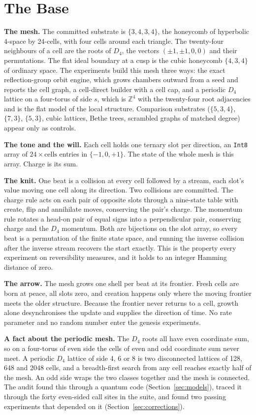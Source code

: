 \section{The Base}

\textbf{The mesh.} The committed substrate is $\{3,4,3,4\}$, the honeycomb of hyperbolic 4-space by 24-cells, with
four cells around each triangle. The twenty-four neighbours of a cell are the roots of $D_4$, the vectors
$(\pm1, \pm1, 0, 0)$ and their permutations. The flat ideal boundary at a cusp is the cubic honeycomb $\{4,3,4\}$ of
ordinary space. The experiments build this mesh three ways: the exact reflection-group orbit engine, which grows
chambers outward from a seed and reports the cell graph, a cell-direct builder with a cell cap, and a periodic
$D_4$ lattice on a four-torus of side $s$, which is $\mathbb{Z}^4$ with the twenty-four root adjacencies and is the
flat model of the local structure. Comparison substrates ($\{5,3,4\}$, $\{7,3\}$, $\{5,3\}$, cubic lattices, Bethe
trees, scrambled graphs of matched degree) appear only as controls.

\textbf{The tone and the will.} Each cell holds one ternary slot per direction, an \texttt{Int8} array of
$24 \times \text{cells}$ entries in $\{-1, 0, +1\}$. The state of the whole mesh is this array. Charge is its sum.

\textbf{The knit.} One beat is a collision at every cell followed by a stream, each slot's value moving one cell
along its direction. Two collisions are committed. The charge rule acts on each pair of opposite slots through a
nine-state table with create, flip and annihilate moves, conserving the pair's charge. The momentum rule rotates a
head-on pair of equal signs into a perpendicular pair, conserving charge and the $D_4$ momentum. Both are bijections
on the slot array, so every beat is a permutation of the finite state space, and running the inverse collision after
the inverse stream recovers the start exactly. This is the property every experiment on reversibility measures, and
it holds to an integer Hamming distance of zero.

\textbf{The arrow.} The mesh grows one shell per beat at its frontier. Fresh cells are born at peace, all slots zero,
and creation happens only where the moving frontier meets the older structure. Because the frontier never returns
to a cell, growth alone desynchronises the update and supplies the direction of time. No rate parameter and no random
number enter the genesis experiments.

\textbf{A fact about the periodic mesh.} The $D_4$ roots all have even coordinate sum, so on a four-torus of even
side the cells of even and odd coordinate sum never meet. A periodic $D_4$ lattice of side 4, 6 or 8 is two
disconnected lattices of 128, 648 and 2048 cells, and a breadth-first search from any cell reaches exactly half of
the mesh. An odd side wraps the two classes together and the mesh is connected. The audit found this through a
quantum code (Section~\ref{sec:models}), traced it through the forty even-sided call sites in the suite, and found
two passing experiments that depended on it (Section~\ref{sec:corrections}).
